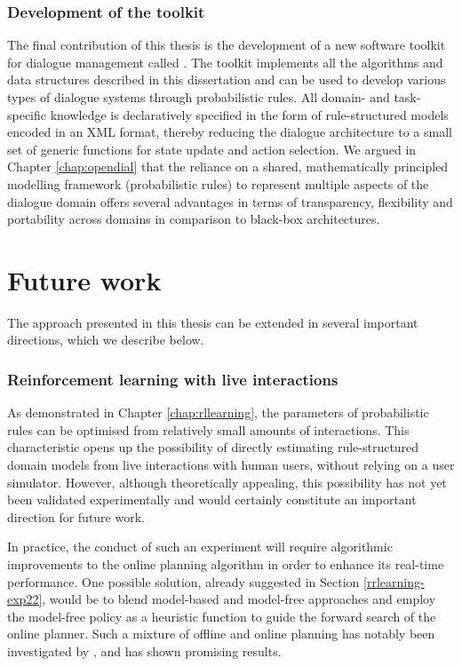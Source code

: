 

\subsubsection*{Development of the \opendial{} toolkit}

The final contribution of this thesis is the development of a new software toolkit for dialogue management called \opendial{}. The toolkit implements all the algorithms and data structures described in this dissertation and can be used to develop various types of dialogue systems through probabilistic rules. All domain- and task-specific knowledge is declaratively specified in the form of rule-structured models encoded in an XML format, thereby reducing the dialogue architecture to a small set of generic functions for state update and action selection.  We argued in Chapter \ref{chap:opendial} that the reliance on a shared, mathematically principled modelling framework (probabilistic rules) to represent multiple aspects of the dialogue domain offers several advantages in terms of transparency, flexibility and portability across domains in comparison to black-box architectures.

\section{Future work}

The approach presented in this thesis can be extended in several important directions, which we describe below. 

\subsubsection*{Reinforcement learning with live interactions}

As demonstrated in Chapter \ref{chap:rllearning}, the parameters of probabilistic rules can be optimised from relatively small amounts of interactions.  This characteristic opens up the possibility of directly estimating rule-structured domain models from live interactions with human users, without relying on a user simulator.  However, although theoretically appealing, this possibility has not yet been validated experimentally and would certainly constitute an important direction for future work.

In practice, the conduct of such an experiment will require algorithmic improvements to the online planning algorithm in order to enhance its real-time performance. One possible solution, already suggested in Section \ref{rrlearning-exp22}, would be to blend model-based and model-free approaches and employ the model-free policy as a heuristic function to guide the forward search of the online planner.  Such a mixture of offline and online planning has notably been investigated by \cite{RossC07}, and has shown promising results.


